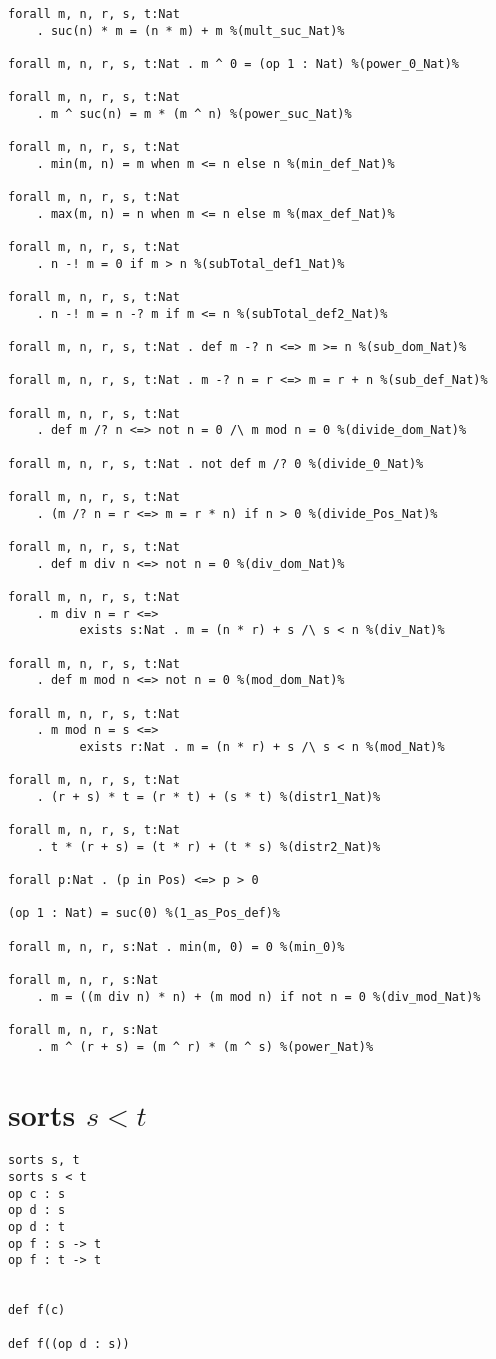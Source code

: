 \documentclass[11pt,a4paper]{article}
\begin{document}
\begin{verbatim}
forall m, n, r, s, t:Nat
    . suc(n) * m = (n * m) + m %(mult_suc_Nat)%

forall m, n, r, s, t:Nat . m ^ 0 = (op 1 : Nat) %(power_0_Nat)%

forall m, n, r, s, t:Nat
    . m ^ suc(n) = m * (m ^ n) %(power_suc_Nat)%

forall m, n, r, s, t:Nat
    . min(m, n) = m when m <= n else n %(min_def_Nat)%

forall m, n, r, s, t:Nat
    . max(m, n) = n when m <= n else m %(max_def_Nat)%

forall m, n, r, s, t:Nat
    . n -! m = 0 if m > n %(subTotal_def1_Nat)%

forall m, n, r, s, t:Nat
    . n -! m = n -? m if m <= n %(subTotal_def2_Nat)%

forall m, n, r, s, t:Nat . def m -? n <=> m >= n %(sub_dom_Nat)%

forall m, n, r, s, t:Nat . m -? n = r <=> m = r + n %(sub_def_Nat)%

forall m, n, r, s, t:Nat
    . def m /? n <=> not n = 0 /\ m mod n = 0 %(divide_dom_Nat)%

forall m, n, r, s, t:Nat . not def m /? 0 %(divide_0_Nat)%

forall m, n, r, s, t:Nat
    . (m /? n = r <=> m = r * n) if n > 0 %(divide_Pos_Nat)%

forall m, n, r, s, t:Nat
    . def m div n <=> not n = 0 %(div_dom_Nat)%

forall m, n, r, s, t:Nat
    . m div n = r <=>
          exists s:Nat . m = (n * r) + s /\ s < n %(div_Nat)%

forall m, n, r, s, t:Nat
    . def m mod n <=> not n = 0 %(mod_dom_Nat)%

forall m, n, r, s, t:Nat
    . m mod n = s <=>
          exists r:Nat . m = (n * r) + s /\ s < n %(mod_Nat)%

forall m, n, r, s, t:Nat
    . (r + s) * t = (r * t) + (s * t) %(distr1_Nat)%

forall m, n, r, s, t:Nat
    . t * (r + s) = (t * r) + (t * s) %(distr2_Nat)%

forall p:Nat . (p in Pos) <=> p > 0

(op 1 : Nat) = suc(0) %(1_as_Pos_def)%

forall m, n, r, s:Nat . min(m, 0) = 0 %(min_0)%

forall m, n, r, s:Nat
    . m = ((m div n) * n) + (m mod n) if not n = 0 %(div_mod_Nat)%

forall m, n, r, s:Nat
    . m ^ (r + s) = (m ^ r) * (m ^ s) %(power_Nat)%

\end{verbatim}

\section*{sorts $s < t$}
\begin{verbatim}
sorts s, t
sorts s < t
op c : s
op d : s
op d : t
op f : s -> t
op f : t -> t


def f(c)

def f((op d : s))
\end{verbatim}
\end{document}
